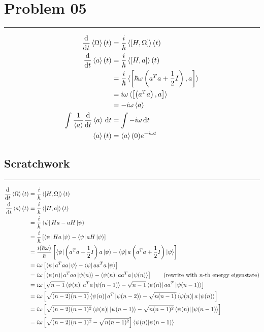 \documentclass[letter, 10pts]{article}
\newcommand{\hb}{\hbar}
\begin{document}
\newpage
\section*{Problem 05} 
\hrule
\begin{align*}
	\frac{\mathrm{d} }{\mathrm{d} t} 
	\braket{ \Omega} (t) &= 
	\frac{i}{\hb} 
	\braket{ [H, \Omega] } (t)\\
	\frac{\mathrm{d} }{\mathrm{d} t} 
	\braket{ a} (t) &= 
	\frac{i}{\hb} 
	\braket{ [H, a] } (t)\\
	&= 
	\frac{i}{\hb} 
	\braket{ \left[ \hb \omega \left(a^{T} a + \frac{1}{2} I \right), a \right]}\\
	&= 
	i \omega 
	\braket{ \left[ \left(a^{T} a \right), a \right]}\\
	&= 
	- i \omega 
	\braket{ a } \\
	\int \frac{1}{\braket{ a}}\frac{\mathrm{d} }{\mathrm{d} t} \braket{ a } \, \mathrm{d} t &= 
	\int
	- i \omega 
	  \, \mathrm{d}  t\\
	\braket{ a} (t) &= \braket{ a}(0) e^{- i \omega t}
\end{align*}

\subsection*{Scratchwork}
\hrule
\begin{align*}
	\frac{\mathrm{d} }{\mathrm{d} t} 
	\braket{ \Omega} (t) &= 
	\frac{i}{\hb} 
	\braket{ [H, \Omega] } (t)\\
	\frac{\mathrm{d} }{\mathrm{d} t} 
	\braket{ a} (t) &= 
	\frac{i}{\hb} 
	\braket{ [H, a] } (t)\\
	&= 
	\frac{i}{\hb} 
	\bra{\psi} Ha - a H \ket{\psi}\\
	&= 
	\frac{i}{\hb} \left[
	\bra{\psi} Ha \ket{\psi}  - \bra{\psi} a H \ket{\psi}\right] \\
	&= 
	\frac{i (\hb \omega )}{\hb} \left[
\bra{\psi} \left(a^{T} a + \frac{1}{2} I \right)a \ket{\psi}  - \bra{\psi} a  \left(a^{T} a + \frac{1}{2} I \right)\ket{\psi}\right] \\
	&= 
	 i \omega \left[
\bra{\psi} a^{T} a a  \ket{\psi}  - \bra{\psi} a  a^{T} a \ket{\psi}\right] \\
	&= 
	 i \omega \left[
	 \bra{\psi(n)} a^{T} a a  \ket{\psi(n)}  - \bra{\psi(n)} a  a^{T} a \ket{\psi(n)}\right] \tag{rewrite with $n$-th energy eigenstate} \\
	&= 
	 i \omega \left[ \sqrt{n-1} 
	 \bra{\psi(n)} a^{T} a  \ket{\psi(n-1)}  - \sqrt{n-1} \bra{\psi(n)} a  a^{T}  \ket{\psi(n-1)}\right]\\ 
	&= 
	 i \omega \left[ \sqrt{(n-2)(n-1)} 
	 \bra{\psi(n)} a^{T}   \ket{\psi(n-2)}  - \sqrt{n (n-1)} \bra{\psi(n)} a \ket{\psi(n)}\right]\\ 
	&= 
	 i \omega \left[ \sqrt{(n-2)(n-1)^2} 
	 \bra{\psi(n)}   \ket{\psi(n-1)}  - \sqrt{n (n-1)^2} \bra{\psi(n)}  \ket{\psi(n-1)}\right]\\
	&= 
	 i \omega \left[ \sqrt{(n-2)(n-1)^2} 
	  - \sqrt{n (n-1)^2} \right] \braket{\psi(n) | \psi(n-1)}
\end{align*}
\end{document}
